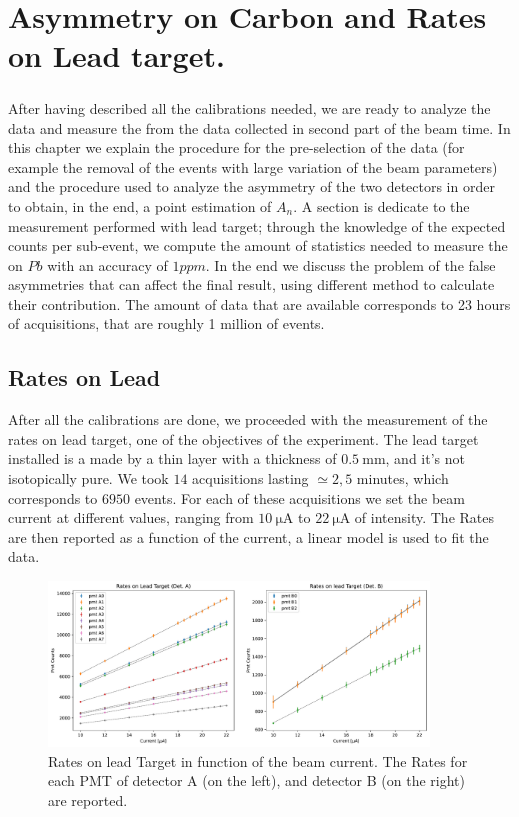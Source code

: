 \chapter{Asymmetry on Carbon and Rates on Lead target.}

\paragraph{}
After having described all the calibrations needed, we are ready to analyze the data and measure the \transv from the data collected in second part of the beam time. In this chapter we explain the procedure for the pre-selection of the data (for example the removal of the events with large variation of the beam parameters) and the procedure used to analyze the asymmetry of the two detectors in order to obtain, in the end, a point estimation of $A_{n}$. A section is dedicate to the measurement performed with lead target; through the knowledge of the expected counts per sub-event, we compute the amount of statistics needed to measure the \transv on $Pb$ with an accuracy of $1 ppm$. In the end we discuss the problem of the false asymmetries that can affect the final result, using different method to calculate their contribution.
The amount of data that are available corresponds to 23 hours of acquisitions, that are roughly 1 million of events. 

\section{Rates on Lead}

After all the calibrations are done, we proceeded with the measurement of the rates on lead target, one of the objectives of the experiment.
The lead target installed is a made by a thin layer with a thickness of $\SI{0.5}{\milli \meter}$, and it's not isotopically pure.
We took $14$ acquisitions lasting $\simeq 2,5$ minutes, which corresponds to $6950$ events. For each of these acquisitions we set the beam current at different values, ranging from $\SI{10}{\micro \ampere}$ to $\SI{22}{\micro \ampere}$ of intensity. The Rates are then reported as a function of the current, a linear model is used to fit the data.

\begin{figure}[hbtp]
\centering
\includegraphics[width = 0.9\textwidth]{Analysis/LeadRates/LeadRates.pdf}
\caption{Rates on lead Target in function of the beam current. The Rates for each PMT of detector A (on the left), and detector B (on the right) are reported.}
\end{figure}

